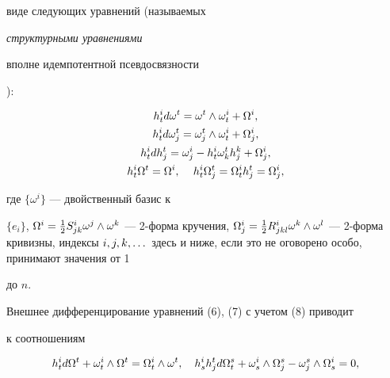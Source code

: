 виде следующих уравнений (называемых {\it структурными уравнениями


вполне идемпотентной псевдосвязности}):


\begin{gather}


h_{t}^{i} d\omega


^{t}=\omega^{t} \wedge \omega_{t}^{i} + \Omega^{i},\\


h_{t}^{i}d\omega_{j}^{t}=\omega_{j}^{t}\wedge \omega_{t}^{i} + \Omega


_{j}^{i}, \\


h_{t}^{i}dh_{j}^{t}=\omega_{j}^{i}-h_{t}^{i}\omega_{k}^{t} h_{j}^{k}


+ \Omega_{j}^{i}, \\


h_{t}^{i} \Omega^{t}=\Omega^{i}, \quad


\,h_{t}^{i}\Omega_{j}^{t}=\Omega_{t}^{i}h_{j}^{t}=\Omega_{j}^{i},\notag


\end{gather}


где $\{\omega^{i}\}$ --- двойственный базис к


$\{e_{i}\}$, $\Omega^{i}=\frac 12 \od S i j k \om


^j\wedge \om^k$ --- 2-форма кручения, $\Omega_{j}^{i}=\frac 12


\R R i j k l \om^k\wedge \om^l$ --- 2-форма кривизны, индексы $i, j, k,


\ds$ здесь и ниже, если это не оговорено особо, принимают значения от 1


до $n$.





Внешнее дифференцирование уравнений (6), (7) с учетом (8) приводит


к соотношениям


\begin{equation}


h_{t}^{i}


d\Omega^{t} +


\omega_{t}^{i}\wedge\Omega^{t}=\Omega_{t}^{i}\wedge\om^t,


\quad


h_{s}^{i}h_{j}^{t}d\Omega_{t}^{s}+\omega_{s}^{i}\wedge\Omega_{j}^{s}


-\omega_{j}^{s} \wedge\Omega_{s}^{i}=0,


\end{equation}


